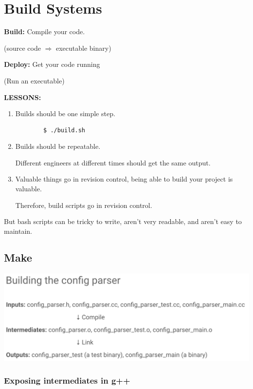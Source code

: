 \documentclass{article}
\begin{document}
\pagebreak

\section{Build Systems}

\textbf{Build: } Compile your code.

(source code $\Rightarrow$ executable binary)

\vspace*{1em}

\textbf{Deploy: } Get your code running

(Run an executable)

\textbf{LESSONS:}
\begin{enumerate}
    \item Builds should be one simple step.
    \begin{verbatim}
        $ ./build.sh
    \end{verbatim}
    \item Builds should be repeatable.

    Different engineers at different times should get the same output.
    \item Valuable things go in revision control, being able to build your project is valuable.
    
    Therefore, build scripts go in revision control.
\end{enumerate}

But bash scripts can be tricky to write, aren't very readable, and aren't easy to maintain. 

\subsection{Make}

\begin{center}
    \includegraphics*[width=0.7\linewidth]{MakeConfigParser.png}
\end{center}

\subsubsection*{Exposing intermediates in g++}
\end{document}
